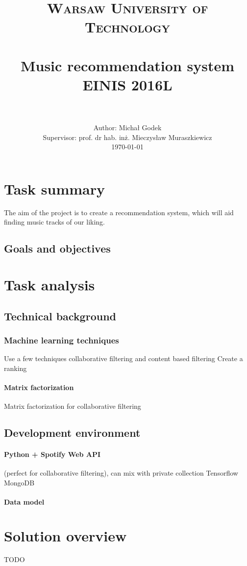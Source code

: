 \documentclass{article}
\title{
		\usefont{OT1}{bch}{b}{n}
		\normalfont \normalsize \textsc{Warsaw University of Technology} \\ [25pt]
		\horrule{1pt} \\[0.4cm]
		\huge Music recommendation system \\[0.3cm]
		\normalfont \normalsize EINIS 2016L\\
		\horrule{1pt} \\[0.5cm]
}
\author{
		\normalfont 	\normalsize
        Author: Michał Godek	\normalsize \\[0.2cm]
        \footnotesize Supervisor: prof. dr hab. inż. Mieczysław Muraszkiewicz \normalfont 	 \normalsize \\[0.5cm]
        \today \\[-3pt]
}
\date{}
\numberwithin{equation}{section}		%
\numberwithin{figure}{section}			%
\numberwithin{table}{section}				%
\begin{document}
\maketitle
\newpage
\tableofcontents
\newpage

\section{Task summary}
The aim of the project is to create a recommendation system, which will aid finding music tracks of our liking.

\subsection{Goals and objectives}

\section{Task analysis}

\subsection{Technical background}
\subsubsection{Machine learning techniques}
Use a few techniques collaborative filtering and content based filtering
Create a ranking

\paragraph{Matrix factorization}
Matrix factorization for collaborative filtering

\subsection{Development environment}
\paragraph{Python + Spotify Web API} (perfect for collaborative filtering), can mix with private collection
Tensorflow\cite{cosineSimilarity}
MongoDB
\paragraph{Data model}

\section{Solution overview}
TODO
\end{document}
